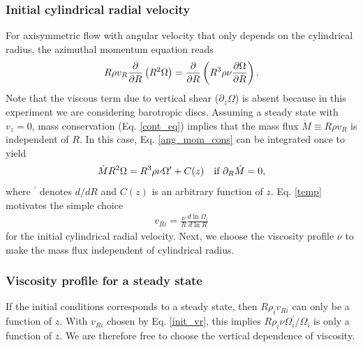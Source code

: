 \subsubsection{Initial cylindrical radial velocity}
For axisymmetric flow with angular velocity that only depends on the
cylindrical radius, the azimuthal momentum equation reads 
\begin{align}\label{ang_mom_cons}
  R\rho v_R\frac{\partial}{\partial R}\left(R^2\Omega \right) = \frac{\partial}{\partial
    R}\left(R^3\rho\nu\frac{\partial\Omega}{\partial R}\right). 
\end{align}
Note that the viscous term due to vertical shear ($\partial_z\Omega$) 
is absent because in this experiment we are considering barotropic
discs. Assuming a steady state with $v_z=0$, mass
conservation (Eq. \ref{cont_eq}) implies that the mass flux  
$\dot{M}\equiv R\rho v_R$ is independent of $R$. In this case,
Eq. \ref{ang_mom_cons} can 
be integrated once to yield 
\begin{align}\label{temp}
  \dot{M}R^2\Omega = R^3\rho\nu\Omega^\prime + C(z) \quad \text{if $\partial_R\dot{M}$} = 0, 
\end{align}
where $^\prime$ denotes $d/dR$ and $C(z)$ is an arbitrary function of
$z$. Eq. \ref{temp} motivates the simple choice
\begin{align}\label{init_vr} 
  v_{Ri} = \frac{\nu}{R}\frac{d\ln{\Omega_i}}{d\ln{R}} 
\end{align}
for the initial cylindrical radial velocity. Next, we choose the
viscosity profile $\nu$ to make the mass flux independent of
cylindrical radius.  

\subsubsection{Viscosity profile for a steady state}\label{visc_model}
If the initial conditions corresponds to a steady state, then
$R \rho_i v_{Ri}$ can only be a function of $z$. With $v_{Ri}$ chosen
by Eq. \ref{init_vr}, this implies 
$R\rho_i\nu\Omega_i^\prime/\Omega_i$ is only a function of $z$. We are
therefore free to choose the vertical dependence of viscosity.   

